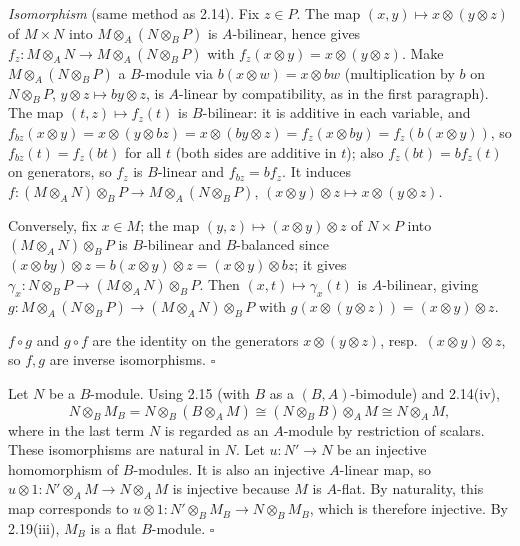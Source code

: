 \documentclass[11pt]{article}
\begin{document}
\emph{Isomorphism} (same method as 2.14). Fix $z\in P$. The map $(x,y)\mapsto x\otimes(y\otimes z)$ of $M\times N$ into $M\otimes_A(N\otimes_BP)$ is $A$-bilinear, hence gives $f_z:M\otimes_AN\to M\otimes_A(N\otimes_BP)$ with $f_z(x\otimes y)=x\otimes(y\otimes z)$. Make $M\otimes_A(N\otimes_BP)$ a $B$-module via $b(x\otimes w)=x\otimes bw$ (multiplication by $b$ on $N\otimes_BP$, $y\otimes z\mapsto by\otimes z$, is $A$-linear by compatibility, as in the first paragraph). The map $(t,z)\mapsto f_z(t)$ is $B$-bilinear: it is additive in each variable, and $f_{bz}(x\otimes y)=x\otimes(y\otimes bz)=x\otimes(by\otimes z)=f_z(x\otimes by)=f_z(b(x\otimes y))$, so $f_{bz}(t)=f_z(bt)$ for all $t$ (both sides are additive in $t$); also $f_z(bt)=bf_z(t)$ on generators, so $f_z$ is $B$-linear and $f_{bz}=bf_z$. It induces $f:(M\otimes_AN)\otimes_BP\to M\otimes_A(N\otimes_BP)$, $(x\otimes y)\otimes z\mapsto x\otimes(y\otimes z)$.

Conversely, fix $x\in M$; the map $(y,z)\mapsto(x\otimes y)\otimes z$ of $N\times P$ into $(M\otimes_AN)\otimes_BP$ is $B$-bilinear and $B$-balanced since $(x\otimes by)\otimes z=b(x\otimes y)\otimes z=(x\otimes y)\otimes bz$; it gives $\gamma_x:N\otimes_BP\to(M\otimes_AN)\otimes_BP$. Then $(x,t)\mapsto\gamma_x(t)$ is $A$-bilinear, giving $g:M\otimes_A(N\otimes_BP)\to(M\otimes_AN)\otimes_BP$ with $g(x\otimes(y\otimes z))=(x\otimes y)\otimes z$.

$f\circ g$ and $g\circ f$ are the identity on the generators $x\otimes(y\otimes z)$, resp.\ $(x\otimes y)\otimes z$, so $f,g$ are inverse isomorphisms. \hfill$\square$

\pf
Let $N$ be a $B$-module. Using 2.15 (with $B$ as a $(B,A)$-bimodule) and 2.14(iv),
\[
N\otimes_BM_B=N\otimes_B(B\otimes_AM)\cong(N\otimes_BB)\otimes_AM\cong N\otimes_AM,
\]
where in the last term $N$ is regarded as an $A$-module by restriction of scalars. These isomorphisms are natural in $N$.
Let $u:N'\to N$ be an injective homomorphism of $B$-modules. It is also an injective $A$-linear map, so $u\otimes1:N'\otimes_AM\to N\otimes_AM$ is injective because $M$ is $A$-flat. By naturality, this map corresponds to $u\otimes1:N'\otimes_BM_B\to N\otimes_BM_B$, which is therefore injective. By 2.19(iii), $M_B$ is a flat $B$-module. \hfill$\square$

\end{document}
